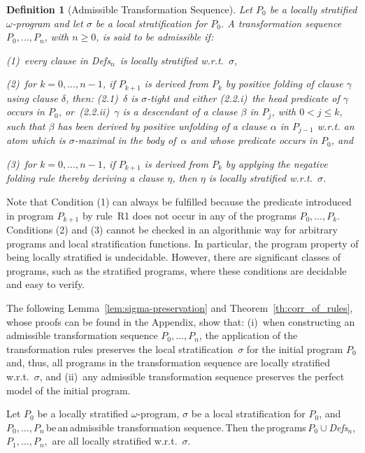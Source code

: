 \documentclass[english]{tlp}
\newtheorem{definition}{Definition} \newtheorem{example}{Example}       \newtheorem{remark}{Remark}
\newcommand{\Mathit}[1]{\mbox{\it #1}}
\newcommand{\Defsn}{\Mathit{Defs}$_{n}$}
\begin{document}
\begin{definition}
[Admissible Transformation Sequence] \label{def:adm-transformation}
Let $P_{0}$ be a locally stratified $\omega$-program and let
$\sigma$ be a local stratification for $P_0$. A transformation
sequence $P_{0},\ldots ,P_{n}$, with $n\!\geq\!0$, is said to be \emph{admissible} if:

\noindent\textup{(1)}~every clause in \Defsn \ is locally stratified w.r.t.~$\sigma$,

\noindent \textup{(2)}~for $k\!=\!0,\ldots,n\! -\! 1$, if $P_{k+1}$ is
derived from $P_{k}$ by positive folding of clause 
\(\gamma\) using clause \(\delta\), then: (2.1)~$\delta$ is 
$\sigma$-tight and {\em either} (2.2.i)~the head
predicate of $\gamma$ occurs in $P_0$, {\em or}~(2.2.ii)~$\gamma$ is a
descendant of a clause $\beta$ in $P_{j}$, with $0\!<\! j\!\leq\!
k$, such that $\beta$ has been derived by positive unfolding of a clause
$\alpha$ in $P_{j-1}$ w.r.t. an atom 
which is $\sigma$-maximal in the body of~$\alpha$
and whose predicate occurs in $P_0$, and

\noindent \textup{(3)}~for $k=0,\ldots ,n\! -\! 1$, if $P_{k+1}$ is
derived from $P_{k}$ by applying the negative folding rule thereby
deriving a clause $\eta$, then $\eta$ is locally stratified
w.r.t.~$\sigma$.
\end{definition}

Note that Condition (1) can always be fulfilled because the
predicate introduced in program $P_{k+1}$ by rule~R1 does
not occur in any of the programs $P_0,\ldots, P_k$.
Conditions (2) and (3) cannot be checked in an algorithmic way for
arbitrary programs and local stratification functions. In particular,
the program property of being locally stratified is undecidable.
However, there are significant classes of programs, such as the 
stratified programs, where these conditions are decidable and easy to
verify.

The following Lemma~\ref{lem:sigma-preservation} and
Theorem~\ref{th:corr_of_rules}, whose proofs can be found in
the Appendix, show that: (i)~when constructing an
admissible transformation sequence $P_0,\ldots,P_n$, the application
of the transformation rules preserves the local
stratification~$\sigma$ for the initial program $P_0$ and, thus, all
programs in the transformation sequence are locally stratified
w.r.t.~$\sigma$, and (ii)~any admissible transformation sequence
preserves the perfect model of the initial program.

\begin{lemma}
\label{lem:sigma-preservation} Let  $P_{0}$ be a locally stratified
$\omega$-program, $\sigma$ be a local stratification for $P_0$, and
$P_{0},\ldots,P_{n}$\,be\,an\,admissible transformation sequence.\,Then
the\,programs\,$P_{0} \cup$\Defsn, $P_{1},\ldots,P_{n},$ are all
locally stratified w.r.t.~$\sigma$.
\end{lemma}
\end{document}
